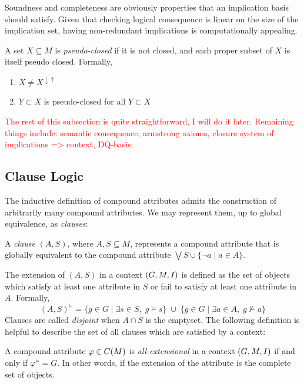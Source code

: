 Soundness and completeness are obviously properties that an implication basis should satisfy. Given that checking logical consequence is linear on the size of the implication set, having non-redundant implications is computationally appealing.

\begin{definition}
	\label{definition:pseudo-closed}

	A set $X\subseteq M$ is \emph{pseudo-closed} if it is not closed, and each
	proper subset of $X$ is itself pseudo closed. Formally,
	\begin{enumerate}
		\item $X \neq X^{\downarrow \uparrow}$

		\item $Y \subset X$ is pseudo-closed for all $Y \subset X$
	\end{enumerate}
\end{definition}

\textcolor{red}{The rest of this subsection is quite straightforward, I will do it
	later. Remaining things include: semantic consequence, armstrong axioms, closure
	system of implications => context, DQ-basis}

\clearpage
\subsection{Clause Logic}
\label{subsection:clause-logic}

The inductive definition of compound attributes admits the construction of arbitrarily
many compound attributes. We may represent them, up to global equivalence, as
\textit{clauses}:
\begin{definition}
	\label{definition:clauses}

	A \emph{clause} $(A,S)$, where $A,S \subseteq M$, represents a compound attribute
	that is globally equivalent to the compound attribute $\bigvee S \cup \{\neg a
		\mid a \in A\}$.
\end{definition}

The extension of $(A,S)$ in a context $(G,M,\mathrel{I})$ is defined as the set of objects which
satisfy at least one attribute in $S$ or fail to satisfy at least one attribute in
$A$. Formally,
\[
	(A,S)^{\vDash}= \{ g \in G \mid \exists s \in S,\; g\vDash s \} \;\cup\; \{ g \in
	G \mid \exists a \in A,\; g \nvDash a \}
\]
Clauses are called \textit{disjoint} when $A \cap S$ is the emptyset. The following
definition is helpful to describe the set of all clauses which are satisfied by a
context:
%
\begin{definition}
	\label{definition:all-extensional}

	A compound attribute $\varphi \in C(M)$ is \emph{all-extensional} in a context
	$(G,M,\mathrel{I})$ if and only if $\varphi^{\vDash}= G$. In other words, if the extension of
	the attribute is the complete set of objects.
\end{definition}

